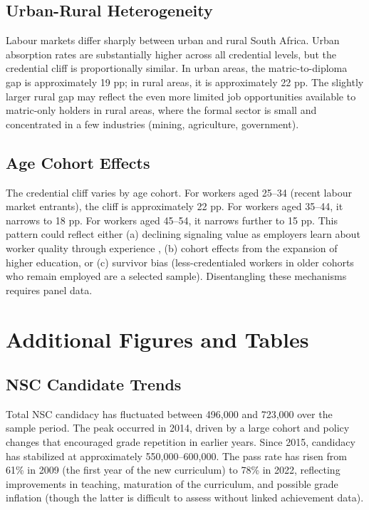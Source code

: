 \documentclass[12pt]{article}
\begin{document}
\subsection{Urban-Rural Heterogeneity}

Labour markets differ sharply between urban and rural South Africa. Urban absorption rates are substantially higher across all credential levels, but the credential cliff is proportionally similar. In urban areas, the matric-to-diploma gap is approximately 19 pp; in rural areas, it is approximately 22 pp. The slightly larger rural gap may reflect the even more limited job opportunities available to matric-only holders in rural areas, where the formal sector is small and concentrated in a few industries (mining, agriculture, government).

\subsection{Age Cohort Effects}

The credential cliff varies by age cohort. For workers aged 25--34 (recent labour market entrants), the cliff is approximately 22 pp. For workers aged 35--44, it narrows to 18 pp. For workers aged 45--54, it narrows further to 15 pp. This pattern could reflect either (a) declining signaling value as employers learn about worker quality through experience \citep{dale2002estimating}, (b) cohort effects from the expansion of higher education, or (c) survivor bias (less-credentialed workers in older cohorts who remain employed are a selected sample). Disentangling these mechanisms requires panel data.


\section{Additional Figures and Tables}
\label{sec:app_additional}

\subsection{NSC Candidate Trends}

Total NSC candidacy has fluctuated between 496{,}000 and 723{,}000 over the sample period. The peak occurred in 2014, driven by a large cohort and policy changes that encouraged grade repetition in earlier years. Since 2015, candidacy has stabilized at approximately 550{,}000--600{,}000. The pass rate has risen from 61\% in 2009 (the first year of the new curriculum) to 78\% in 2022, reflecting improvements in teaching, maturation of the curriculum, and possible grade inflation (though the latter is difficult to assess without linked achievement data).
\end{document}
